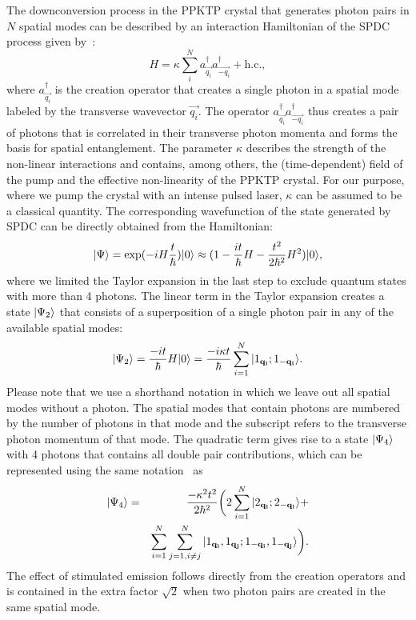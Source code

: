 The downconversion process in the PPKTP crystal that generates photon pairs in $N$ spatial modes can be described by an interaction Hamiltonian of the SPDC process given by~\cite{Simon2000,Kok2000}:
\begin{equation}
H = \kappa \sum_{i}^N a^\dagger_{\vec{q_i}} a^\dagger_{\vec{-q_i}} + \mathrm{h.c.},
\end{equation}
where $a^\dagger_{\vec{q_i}}$ is the creation operator that creates a single photon in a spatial mode labeled by the transverse wavevector $\vec{q_i}$. The operator $a^\dagger_{\vec{q_i}} a^\dagger_{\vec{-q_i}}$ thus creates a pair of photons that is correlated in their transverse photon momenta and forms the basis for spatial entanglement. The parameter $\kappa$ describes the strength of the non-linear interactions and contains, among others, the (time-dependent) field of the pump and the effective non-linearity of the PPKTP crystal. For our purpose, where we pump the crystal with an intense pulsed laser, $\kappa$ can be assumed to be a classical  quantity. The corresponding wavefunction of the state generated by SPDC can be directly obtained from the Hamiltonian:
$$
\vert \Psi \rangle = \exp(-i H \frac{t}{\hbar}) \vert 0 \rangle \approx (1-\frac{i t}{\hbar} H - \frac{t^2}{2 \hbar^2} H^2) \vert 0 \rangle,
$$
where we limited the Taylor expansion in the last step to exclude quantum states with more than 4 photons. The linear term in the Taylor expansion creates a state $\vert \Psi_2 \rangle$ that consists of a superposition of a single photon pair in any of the available spatial modes:
$$
\vert \Psi_2 \rangle = \frac{- i t}{\hbar}H \vert 0 \rangle = \frac{- i \kappa t}{\hbar} \sum_{i=1}^N \vert 1_{ \mathbf{ q_i } };1_{ \mathbf{ -q_i } } \rangle.
$$
Please note that we use a shorthand notation in which we leave out all spatial modes without a photon. The spatial modes that contain photons are numbered by the number of photons in that mode and the subscript refers to the transverse photon momentum of that mode. The quadratic term gives rise to a state $\vert \Psi_4 \rangle$ with 4 photons that contains all double pair contributions, which can be represented using the same notation~\cite{Riedmatten2004} as
\begin{eqnarray*} \vert \Psi_4 \rangle & = & \frac{- \kappa^2 t^2}{2 \hbar^2} \bigg( 2 \sum_{i=1}^N \vert 2_{ \mathbf{ q_i } };2_{ \mathbf{ -q_i } } \rangle + \\ & & \sum_{i=1}^N \sum_{j=1, i \neq j}^{N} \vert 1_{ \mathbf{ q_i } },1_{ \mathbf{ q_j } };1_{ \mathbf{ -q_i } },1_{ \mathbf{ -q_j } } \rangle \bigg).
\end{eqnarray*}
The effect of stimulated emission follows directly from the creation operators and is contained in the extra factor $\sqrt{2}$ when two photon pairs are created in the same spatial mode.

